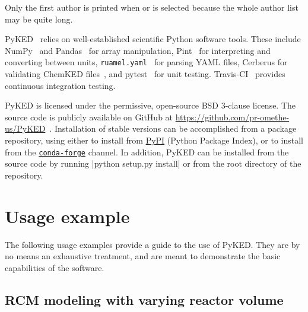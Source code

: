 \documentclass[12pt]{ussci}
\newcommand\ck{ChemKED}
\newcommand\pk{PyKED}
\begin{document}
Only the first author is printed when  or
 is selected because the whole author list may be
quite long.

\pk{}~\autocite{PyKED} relies on well-established scientific Python software tools.
These include NumPy~\autocite{vanderWalt:2011np} and Pandas~\autocite{pandas,McKinney2010}
for array manipulation, Pint~\autocite{Grecco2016} for interpreting and converting
between units, \texttt{ruamel.yaml}~\autocite{ruamel_yaml} for parsing YAML
files, Cerberus for validating \ck{} files~\autocite{cerberus}, and
pytest~\autocite{pytest:3.0.1} for unit testing. Travis-CI~\autocite{Travis2016}
provides continuous integration testing.

\pk{} is licensed under the permissive, open-source BSD 3-clause license. The
source code is publicly available on GitHub at
\url{https://github.com/pr-omethe-us/PyKED}~\autocite{PyKED}. Installation of stable versions
can be accomplished from a package repository, using either  to install
from \href{https://pypi.python.org/pypi}{PyPI} (Python Package Index), or
 to install from the
\href{https://anaconda.org/conda-forge}{\texttt{conda-forge}} channel. In
addition, \pk{} can be installed from the source code by running
\pybox|python setup.py install| or  from the root
directory of the repository.

\section{Usage example}\label{sec:usage-example}

The following usage examples provide a guide to the use of \pk{}. They are by no
means an exhaustive treatment, and are meant to demonstrate the basic
capabilities of the software.

\subsection{RCM modeling with varying reactor volume}\label{sec:rcm-modeling}
\end{document}
